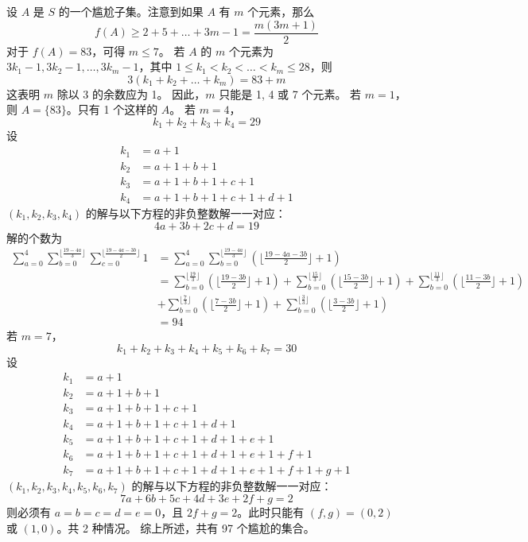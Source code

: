 \begin{questions}
\begin{solution}
设 $A$ 是 $S$ 的一个尴尬子集。注意到如果 $A$ 有 $m$ 个元素，那么
\[
f(A) \ge 2 + 5 + \dots + 3m - 1 = \frac{m(3m + 1)}{2}
\]
对于 $f(A) = 83$，可得 $m \le 7$。
若 $A$ 的 $m$ 个元素为 $3k_1 - 1, 3k_2 - 1, \dots, 3k_m - 1$，其中 $1 \le k_1 < k_2 < \dots < k_m \le 28$，则
\[
3(k_1 + k_2 + \dots + k_m) = 83 + m
\]
这表明 $m$ 除以 3 的余数应为 1。
因此，$m$ 只能是 1, 4 或 7 个元素。
若 $m = 1$，则 $A = \{83\}$。只有 1 个这样的 $A$。
若 $m = 4$，
\[
k_1 + k_2 + k_3 + k_4 = 29
\]
设
\begin{align}
k_1 &= a + 1 \\
k_2 &= a + 1 + b + 1 \\
k_3 &= a + 1 + b + 1 + c + 1 \\
k_4 &= a + 1 + b + 1 + c + 1 + d + 1
\end{align}
$(k_1, k_2, k_3, k_4)$ 的解与以下方程的非负整数解一一对应：
\[
4a + 3b + 2c + d = 19
\]
解的个数为
\begin{align}
\sum_{a=0}^{4} \sum_{b=0}^{\lfloor \frac{19-4a}{3} \rfloor} \sum_{c=0}^{\lfloor \frac{19-4a-3b}{2} \rfloor} 1 &= \sum_{a=0}^{4} \sum_{b=0}^{\lfloor \frac{19-4a}{3} \rfloor} \left( \lfloor \frac{19 - 4a - 3b}{2} \rfloor + 1 \right) \\
&= \sum_{b=0}^{\lfloor \frac{19}{3} \rfloor} \left( \lfloor \frac{19 - 3b}{2} \rfloor + 1 \right) + \sum_{b=0}^{\lfloor \frac{15}{3} \rfloor} \left( \lfloor \frac{15 - 3b}{2} \rfloor + 1 \right) + \sum_{b=0}^{\lfloor \frac{11}{3} \rfloor} \left( \lfloor \frac{11 - 3b}{2} \rfloor + 1 \right) \\
&+ \sum_{b=0}^{\lfloor \frac{7}{3} \rfloor} \left( \lfloor \frac{7 - 3b}{2} \rfloor + 1 \right) + \sum_{b=0}^{\lfloor \frac{3}{3} \rfloor} \left( \lfloor \frac{3 - 3b}{2} \rfloor + 1 \right) \\
&= 94
\end{align}
若 $m = 7$，
\[
k_1 + k_2 + k_3 + k_4 + k_5 + k_6 + k_7 = 30
\]
设
\begin{align}
k_1 &= a + 1 \\
k_2 &= a + 1 + b + 1 \\
k_3 &= a + 1 + b + 1 + c + 1 \\
k_4 &= a + 1 + b + 1 + c + 1 + d + 1 \\
k_5 &= a + 1 + b + 1 + c + 1 + d + 1 + e + 1 \\
k_6 &= a + 1 + b + 1 + c + 1 + d + 1 + e + 1 + f + 1 \\
k_7 &= a + 1 + b + 1 + c + 1 + d + 1 + e + 1 + f + 1 + g + 1
\end{align}
$(k_1, k_2, k_3, k_4, k_5, k_6, k_7)$ 的解与以下方程的非负整数解一一对应：
\[
7a + 6b + 5c + 4d + 3e + 2f + g = 2
\]
则必须有 $a = b = c = d = e = 0$，且 $2f + g = 2$。此时只能有 $(f, g) = (0, 2)$ 或 $(1, 0)$。共 2 种情况。
综上所述，共有 97 个尴尬的集合。
\end{solution}


\end{questions}
